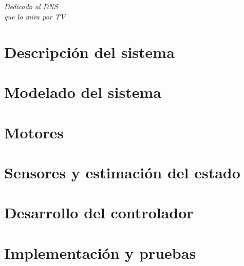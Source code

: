 \documentclass[spanish,12pt,a4paper,titlepage,twoside,openright]{scrbook}
\begin{document}
\rmfamily
\renewcommand{\appendixtocname}{Anexos}

\chapter*{}
\begin{flushright}
\textit{
Dedicado al DNS \\
que lo mira por TV}
\end{flushright}
\tableofcontents

\part{Descripción del sistema}


\part{Modelado del sistema}


\part{Motores}


\part{Sensores y estimaci\'on del estado}
\label{part:sensores-y-estimacion-del-estado}






\part{Desarrollo del controlador}



\part{Implementaci\'on y pruebas}




\cleardoublepage
\addappheadtotoc
\renewcommand{\appendixpagename}{Anexos}
\appendixpage
\renewcommand{\appendixname}{Anexo}


\appendix 










 

\end{document}
